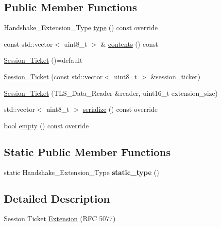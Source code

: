 \subsection*{Public Member Functions}
\begin{DoxyCompactItemize}
\item 
Handshake\+\_\+\+Extension\+\_\+\+Type \hyperlink{class_botan_1_1_t_l_s_1_1_session___ticket_a0fb84fe33c30d28e0dee120ecc2fe228}{type} () const override
\item 
const std\+::vector$<$ uint8\+\_\+t $>$ \& \hyperlink{class_botan_1_1_t_l_s_1_1_session___ticket_abe74c7dc9a16b878f02694e62364243d}{contents} () const
\item 
\hyperlink{class_botan_1_1_t_l_s_1_1_session___ticket_a362933f62a9c5d9eb8d06a2545cf78a1}{Session\+\_\+\+Ticket} ()=default
\item 
\hyperlink{class_botan_1_1_t_l_s_1_1_session___ticket_a24f03efc3f21477de5c5be578f53dd69}{Session\+\_\+\+Ticket} (const std\+::vector$<$ uint8\+\_\+t $>$ \&session\+\_\+ticket)
\item 
\hyperlink{class_botan_1_1_t_l_s_1_1_session___ticket_a677e88a19f33368be6ffa73b2b86a58a}{Session\+\_\+\+Ticket} (T\+L\+S\+\_\+\+Data\+\_\+\+Reader \&reader, uint16\+\_\+t extension\+\_\+size)
\item 
std\+::vector$<$ uint8\+\_\+t $>$ \hyperlink{class_botan_1_1_t_l_s_1_1_session___ticket_a446a320f05bfc710740defcd5ac0ca58}{serialize} () const override
\item 
bool \hyperlink{class_botan_1_1_t_l_s_1_1_session___ticket_a6796d47c184b69f1eaf5bcee582a4ebe}{empty} () const override
\end{DoxyCompactItemize}
\subsection*{Static Public Member Functions}
\begin{DoxyCompactItemize}
\item 
\mbox{\label{class_botan_1_1_t_l_s_1_1_session___ticket_acf1d5d6209304a3b171b5e8c45195b36}} 
static Handshake\+\_\+\+Extension\+\_\+\+Type {\bfseries static\+\_\+type} ()
\end{DoxyCompactItemize}


\subsection{Detailed Description}
Session Ticket \hyperlink{class_botan_1_1_t_l_s_1_1_extension}{Extension} (R\+FC 5077) 

